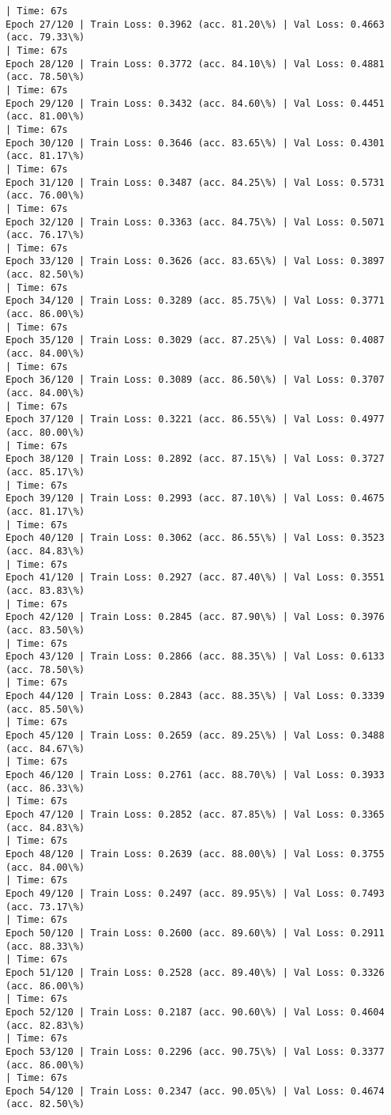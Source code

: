 \documentclass[8pt]{extarticle}
\begin{document}
\begin{Verbatim}[commandchars=\\\{\}]
| Time: 67s
Epoch 27/120 | Train Loss: 0.3962 (acc. 81.20\%) | Val Loss: 0.4663 (acc. 79.33\%)
| Time: 67s
Epoch 28/120 | Train Loss: 0.3772 (acc. 84.10\%) | Val Loss: 0.4881 (acc. 78.50\%)
| Time: 67s
Epoch 29/120 | Train Loss: 0.3432 (acc. 84.60\%) | Val Loss: 0.4451 (acc. 81.00\%)
| Time: 67s
Epoch 30/120 | Train Loss: 0.3646 (acc. 83.65\%) | Val Loss: 0.4301 (acc. 81.17\%)
| Time: 67s
Epoch 31/120 | Train Loss: 0.3487 (acc. 84.25\%) | Val Loss: 0.5731 (acc. 76.00\%)
| Time: 67s
Epoch 32/120 | Train Loss: 0.3363 (acc. 84.75\%) | Val Loss: 0.5071 (acc. 76.17\%)
| Time: 67s
Epoch 33/120 | Train Loss: 0.3626 (acc. 83.65\%) | Val Loss: 0.3897 (acc. 82.50\%)
| Time: 67s
Epoch 34/120 | Train Loss: 0.3289 (acc. 85.75\%) | Val Loss: 0.3771 (acc. 86.00\%)
| Time: 67s
Epoch 35/120 | Train Loss: 0.3029 (acc. 87.25\%) | Val Loss: 0.4087 (acc. 84.00\%)
| Time: 67s
Epoch 36/120 | Train Loss: 0.3089 (acc. 86.50\%) | Val Loss: 0.3707 (acc. 84.00\%)
| Time: 67s
Epoch 37/120 | Train Loss: 0.3221 (acc. 86.55\%) | Val Loss: 0.4977 (acc. 80.00\%)
| Time: 67s
Epoch 38/120 | Train Loss: 0.2892 (acc. 87.15\%) | Val Loss: 0.3727 (acc. 85.17\%)
| Time: 67s
Epoch 39/120 | Train Loss: 0.2993 (acc. 87.10\%) | Val Loss: 0.4675 (acc. 81.17\%)
| Time: 67s
Epoch 40/120 | Train Loss: 0.3062 (acc. 86.55\%) | Val Loss: 0.3523 (acc. 84.83\%)
| Time: 67s
Epoch 41/120 | Train Loss: 0.2927 (acc. 87.40\%) | Val Loss: 0.3551 (acc. 83.83\%)
| Time: 67s
Epoch 42/120 | Train Loss: 0.2845 (acc. 87.90\%) | Val Loss: 0.3976 (acc. 83.50\%)
| Time: 67s
Epoch 43/120 | Train Loss: 0.2866 (acc. 88.35\%) | Val Loss: 0.6133 (acc. 78.50\%)
| Time: 67s
Epoch 44/120 | Train Loss: 0.2843 (acc. 88.35\%) | Val Loss: 0.3339 (acc. 85.50\%)
| Time: 67s
Epoch 45/120 | Train Loss: 0.2659 (acc. 89.25\%) | Val Loss: 0.3488 (acc. 84.67\%)
| Time: 67s
Epoch 46/120 | Train Loss: 0.2761 (acc. 88.70\%) | Val Loss: 0.3933 (acc. 86.33\%)
| Time: 67s
Epoch 47/120 | Train Loss: 0.2852 (acc. 87.85\%) | Val Loss: 0.3365 (acc. 84.83\%)
| Time: 67s
Epoch 48/120 | Train Loss: 0.2639 (acc. 88.00\%) | Val Loss: 0.3755 (acc. 84.00\%)
| Time: 67s
Epoch 49/120 | Train Loss: 0.2497 (acc. 89.95\%) | Val Loss: 0.7493 (acc. 73.17\%)
| Time: 67s
Epoch 50/120 | Train Loss: 0.2600 (acc. 89.60\%) | Val Loss: 0.2911 (acc. 88.33\%)
| Time: 67s
Epoch 51/120 | Train Loss: 0.2528 (acc. 89.40\%) | Val Loss: 0.3326 (acc. 86.00\%)
| Time: 67s
Epoch 52/120 | Train Loss: 0.2187 (acc. 90.60\%) | Val Loss: 0.4604 (acc. 82.83\%)
| Time: 67s
Epoch 53/120 | Train Loss: 0.2296 (acc. 90.75\%) | Val Loss: 0.3377 (acc. 86.00\%)
| Time: 67s
Epoch 54/120 | Train Loss: 0.2347 (acc. 90.05\%) | Val Loss: 0.4674 (acc. 82.50\%)

\end{Verbatim}
\end{document}
